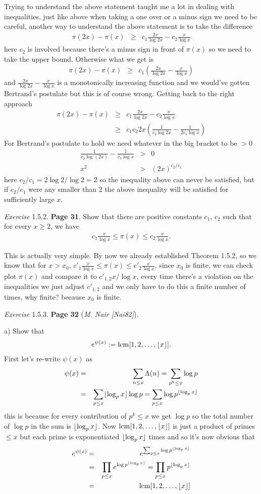\documentclass[aps,preprint,preprintnumbers,nofootinbib,showpacs,prd]{revtex4-1}
\newcommand{\nbea}{\begin{eqnarray*}}
\newcommand{\neea}{\end{eqnarray*}}
\DeclarePairedDelimiter{\floor}{\lfloor}{\rfloor}
\begin{document}
Trying to understand the above statement taught me a lot in dealing with inequalities, just like above when taking a one over or a minus sign we need to be careful, another way to understand the above statement is to take the difference
%
\nbea
\pi(2x) - \pi(x) & \ge & c_1 \frac{2x}{\log 2x} - c_2 \frac{x}{\log x}
\neea
%
here $c_2$ is involved because there's a minus sign in front of $\pi(x)$ so we need to take the upper bound. Otherwise what we get is
%
\nbea
\pi(2x) - \pi(x) & \ge & c_1 \left( \frac{2x}{\log 2x} - \frac{x}{\log x}\right )
\neea
%
and $\frac{2x}{\log 2x} - \frac{x}{\log x}$ is a monotonically increasing function and we would've gotten Bertrand's postulate but this is of course wrong. Getting back to the right approach
%
\nbea
\pi(2x) - \pi(x) & \ge & c_1 \frac{2x}{\log 2x} - c_2 \frac{x}{\log x} \\
& \ge &  c_1 c_2 2x \left ( \frac{1}{c_2 \log 2x} - \frac{1}{2 c_1 \log x} \right )
\neea
%
For Bertrand's postulate to hold we need whatever in the big bracket to be $> 0$
%
\nbea
\frac{1}{c_2\log (2x)} - \frac{1}{c_1\log x} & > & 0 \\
x^{2} & > & (2x)^{c_2/c_1}
\neea
%
here $c_2/c_1 = 2\log2/\log2 = 2$ so the inequality above can never be satisfied, but if $c_2/c_1$ were any smaller than 2 the above inequality will be satisfied for sufficiently large $x$.

{\it Exercise} 1.5.2. {\bf Page 31}. Show that there are positive constants $c_1$, $c_2$ such that for every $x \ge 2$, we have
%
\nbea
c_1 \frac{x}{\log x} \le  \pi(x) \le c_2 \frac{x}{\log x}.
\neea
%

This is actually very simple. By now we already established Theorem 1.5.2, so we know that for $x > x_0$, $c'_1 \frac{x}{\log x} \le  \pi(x) \le c'_2 \frac{x}{\log x}$, since $x_0$ is finite, we can check plot $\pi(x)$ and compare it to $c'_{1,2} x/\log x$, every time there's a violation on the inequalities we just adjust $c'_{1,2}$ and we only have to do this a finite number of times, why finite? because $x_0$ is finite.




{\it Exercise} 1.5.3. {\bf Page 32}  ({\it M. Nair [Nai82]}).

a) Show that
%
\nbea
e^{\psi(x)} := {\rm lcm}[1, 2, \dots , \floor{x} ].
\neea
%
First let's re-write $\psi(x)$ as
%
\nbea
\psi(x) & = & \sum_{n \le x} \Lambda(n) = \sum_{p^k \le x} \log p \\
& = & \sum_{p \le x} \floor{\log_p x} \log p = \sum_{p \le x} \log p^{\floor{\log_p x}}
\neea
%
this is because for every contribution of $p^k \le x$ we get $\log p$ so the total number of $\log p$ in the sum is $\floor{\log_p x}$. Now ${\rm lcm}[1,2,\dots,\floor{x}]$ is just a product of primes $\le x$ but each prime is exponentiated $\floor{\log_p x}$ times and so it's now obvious that 
%
\nbea
e^{\psi(x)} & = & e^{\sum_{p \le x} \log p^{\floor{\log_p x}}} \\
& = & \prod_{p \le x} e^{\log p^{\floor{\log_p x}}} =  \prod_{p \le x} {p^{\floor{\log_p x}}} \\
& = & {\rm lcm}[1,2,\dots,\floor{x}]
\neea
%
\end{document}
